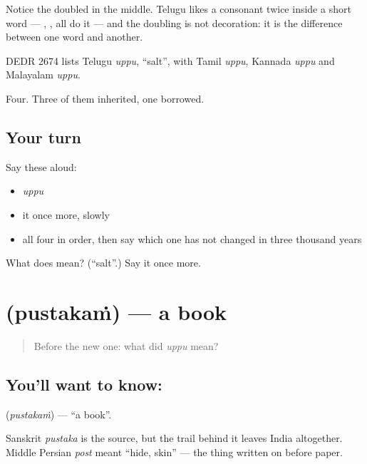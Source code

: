Notice the doubled  in the middle. Telugu likes a consonant twice inside a short word — , ,  all do it — and the doubling is not decoration: it is the difference between one word and another.

DEDR 2674 lists Telugu \emph{uppu}, \textquotedblleft{}salt\textquotedblright{}, with Tamil \emph{uppu}, Kannada \emph{uppu} and Malayalam \emph{uppu}.

\begin{grammarlens}[title={What you've built}]
Four. Three of them inherited, one borrowed.
\end{grammarlens}

\subsection*{Your turn}
Say these aloud:

\begin{itemize}
\raggedright
  \item \emph{uppu}
  \item it once more, slowly
  \item all four in order, then say which one has not changed in three thousand years
\end{itemize}

\begin{tcolorbox}[breakable,colback=teal!4,colframe=teal!35!black,title={Before you move on}]
What does  mean? (\textquotedblleft{}salt\textquotedblright{}.) Say it once more.
\end{tcolorbox}
\section[\texorpdfstring{\te{పుస్తకం} (pustakaṁ)}{పుస్తకం (pustakaṁ)}]{ (pustakaṁ) — a book}

\label{lesson:TE-C46-book}



\begin{quote}
Before the new one: what did \emph{uppu} mean?
\end{quote}

\subsection*{You'll want to know: }
\textbf{} (\emph{pustakaṁ}) — \textquotedblleft{}a book\textquotedblright{}.

Sanskrit \emph{pustaka} is the source, but the trail behind it leaves India altogether. Middle Persian \emph{post} meant \textquotedblleft{}hide, skin\textquotedblright{} — the thing written on before paper.

